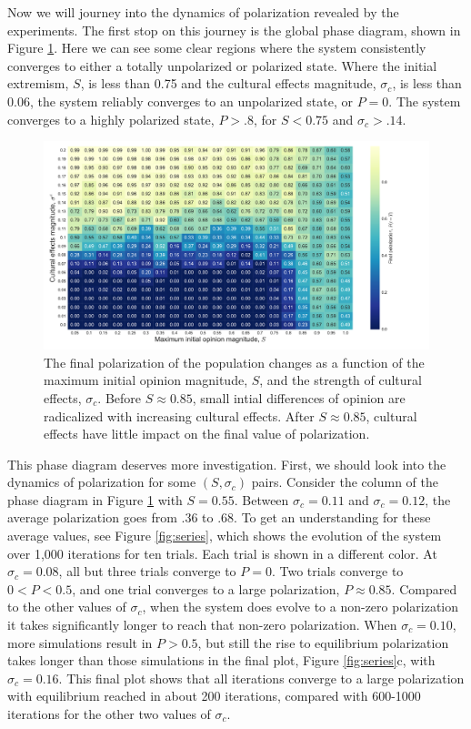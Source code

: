 \documentclass[11pt,letterpaper]{article}
\newcommand{\sigc}{\ensuremath{\sigma_c}}
\begin{document}
Now we will journey into the dynamics of polarization revealed by the experiments.
The first stop on this journey is the global phase diagram, shown in Figure
\ref{fig:phase-diagram}. Here we can see some clear regions where the system
consistently converges to either a totally unpolarized or polarized state.
Where the initial extremism, $S$, is less than 0.75 and the 
cultural effects magnitude, $\sigc$, is less than 0.06, the system
reliably converges to an unpolarized state, or $P=0$. The system converges to
a highly polarized state, $P > .8$, for $S < 0.75$ and $\sigc > .14$. 

\begin{figure}
  \centering
  \includegraphics[width=\textwidth]{figures/phase-diagram.pdf}
\caption{The final polarization of the population changes as a function of
  the maximum initial opinion magnitude, $S$, and the strength of cultural
  effects, $\sigma_c$. Before $S\approx0.85$, small intial differences of
  opinion are radicalized with increasing cultural effects. 
  After $S\approx0.85$, cultural effects have little impact on the final 
  value of polarization.}
\label{fig:phase-diagram}
\end{figure}

This phase diagram deserves more investigation. First, we should look into
the dynamics of polarization for some $(S, \sigc)$ pairs. Consider the 
column of the phase diagram in Figure \ref{fig:phase-diagram} with 
$S=0.55$. Between $\sigma_c=0.11$ and $\sigma_c=0.12$, the average polarization
goes from .36 to .68. To get an understanding for these average values, 
see Figure \ref{fig:series}, which shows the evolution of the system over 
1,000 iterations for ten trials. Each trial is shown in a different color.
At $\sigc=0.08$, all but three trials converge to $P=0$. Two trials converge to
$0 < P < 0.5$, and one trial converges to a large polarization, $P\approx0.85$.
Compared to the other values of $\sigc$, when the system does evolve to a
non-zero polarization it takes significantly longer to reach that non-zero
polarization. When $\sigc=0.10$, more simulations result in $P>0.5$, but still
the rise to equilibrium polarization takes longer than those simulations in
the final plot, Figure \ref{fig:series}c, with $\sigc=0.16$. This final plot
shows that all iterations converge to a large polarization with equilibrium
reached in about 200 iterations, compared with 600-1000 iterations for the
other two values of $\sigc$.
\end{document}

